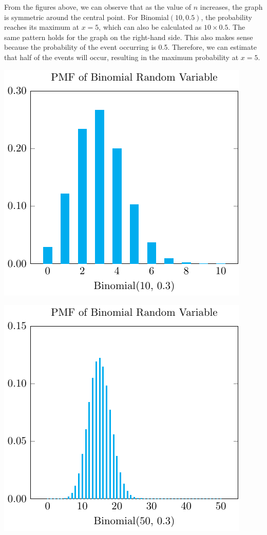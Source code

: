 From the figures above, we can observe that as the value of \(n\) increases, the graph is symmetric around the central point. For  Binomial\((10, 0.5)\), the probability reaches its maximum at \(x = 5\), which can also be calculated as \(10 \times 0.5\). The same pattern holds for the graph on the right-hand side. This also makes sense because the probability of the event occurring is 0.5. Therefore, we can estimate that half of the events will occur, resulting in the maximum probability at \(x = 5\).

\begin{minipage}{0.5\textwidth}
  \includegraphics{Figures/PMF_Binominal_10_03.pdf}
\end{minipage}
\begin{minipage}{0.5\textwidth}
  \includegraphics{Figures/PMF_Binominal_50_03.pdf}
\end{minipage}

